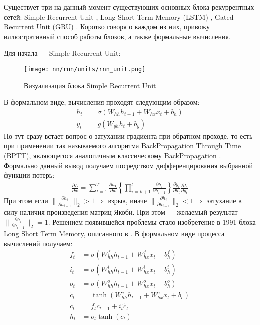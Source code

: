 Существует три на данный момент существующих основных блока рекуррентных сетей: Simple Recurrent Unit \cite{rumelhart1986learning}, Long Short Term Memory (LSTM) \cite{hochreiter1997long}, Gated Recurrent Unit (GRU) \cite{cho2014learning}. Коротко говоря о каждом из них, привожу иллюстративный способ работы блоков, а также формальные вычисления.

Для начала --- Simple Recurrent Unit:
\begin{figure}[H]
	\centering
	\texttt{[image: nn/rnn/units/rnn\_unit.png]}
	\caption{Визуализация блока Simple Recurrent Unit}
	\label{fig::rnn_unit}
\end{figure}
\noindent В формальном виде, вычисления проходят следующим образом:
\begin{equation}
	\begin{split}
		h_t & = \sigma\left(W_{hh}h_{t - 1} + W_{hx} x_t + b_h\right)\\
		y_ t & = g\left(W_{yh}h_t + b_y\right)
	\end{split}
\end{equation}
Но тут сразу встает вопрос о затухании градиента при обратном проходе, то есть при применении так называемого алгоритма BackPropagation Through Time (BPTT), являющегося аналогичным классическому BackPropagation \cite{linnainmaa1970representation}. Формально данный вывод получаем посредством дифференцирования выбранной функции потерь:
\begin{equation}
	\begin{split}
		\frac{\partial L}{\partial w} = \sum_{t = 1}^T  \frac{\partial h_k}{\partial w} \left\{ \prod_{i = k + 1}^{t} \frac{\partial h_i}{\partial h_{i - 1}}\right\} \frac{\partial y_t}{\partial h_t} \frac{\partial L}{\partial y_t}
	\end{split}
\end{equation}
При этом если $\lVert \frac{\partial h_i}{\partial h_{i - 1}} \rVert_2 > 1 \Rightarrow$ взрыв, иначе $\lVert \frac{\partial h_i}{\partial h_{i - 1}} \rVert_2 < 1 \Rightarrow$ затухание в силу наличия произведения матриц Якоби. При этом --- желаемый результат --- $\lVert \frac{\partial h_i}{\partial h_{i - 1}} \rVert_2 = 1$. Решением появившейся проблемы стало изобретение в 1991 блока Long Short Term Memory, описанного в \cite{hochreiter1991untersuchungen, hochreiter1997long}. В формальном виде процесса вычислений получаем:
\begin{equation}
	\begin{split}
		f_t & = \sigma \left(W_{hh}^f h_{t - 1} + W_{hx}^f x_t + b_h^f\right)\\
		i_t & = \sigma \left(W_{hh}^i h_{t - 1} + W_{hx}^i x_t + b_h^i\right)\\
		o_t & = \sigma \left(W_{hh}^o h_{t - 1} + W_{hx}^o x_t + b_h^o\right)\\
		\tilde{c}_t & = \tanh\left(W_{hh}^c h_{t - 1} + W_{hx}^c x_t + b_c\right)\\
		c_t & = f_t c_{t - 1} + i_{t} \tilde{c}_t\\
		h_t & = o_t \tanh\left(c_t\right)
	\end{split}
\end{equation}
